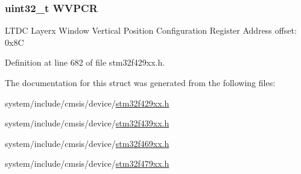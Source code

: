 \subsubsection[{\texorpdfstring{W\+V\+P\+CR}{WVPCR}}]{ uint32\+\_\+t W\+V\+P\+CR}\hypertarget{struct_l_t_d_c___layer___type_def_aafd5aea090b8ab4f7cbaee88503cb6a1}{}\label{struct_l_t_d_c___layer___type_def_aafd5aea090b8ab4f7cbaee88503cb6a1}
L\+T\+DC Layerx Window Vertical Position Configuration Register Address offset\+: 0x8C 

Definition at line 682 of file stm32f429xx.\+h.



The documentation for this struct was generated from the following files\+:\begin{DoxyCompactItemize}
\item 
system/include/cmsis/device/\hyperlink{stm32f429xx_8h}{stm32f429xx.\+h}\item 
system/include/cmsis/device/\hyperlink{stm32f439xx_8h}{stm32f439xx.\+h}\item 
system/include/cmsis/device/\hyperlink{stm32f469xx_8h}{stm32f469xx.\+h}\item 
system/include/cmsis/device/\hyperlink{stm32f479xx_8h}{stm32f479xx.\+h}\end{DoxyCompactItemize}
